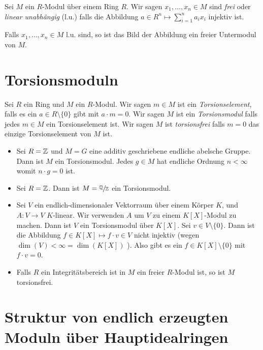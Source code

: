 \begin{definition}
	Sei $M$ ein $ R$-Modul über einem Ring $R$. Wir sagen $x_1,\ldots,x_{n} \in M$ sind \emph{frei} oder \emph{linear unabhängig} (l.u.) falls die Abbildung
	$a \in R^{n} \mapsto \sum_{i = 1}^{n} a_{i} x_{i}$ injektiv ist.

	Falls $x_1,\ldots,x_{n} \in M$ l.u. sind, so ist das Bild der Abbildung ein freier Untermodul von $M$.
\end{definition}

\section{Torsionsmoduln}
\begin{definition}
	Sei $R$ ein Ring und $M$ ein $R$-Modul. Wir sagen $m \in M$ ist ein \emph{Torsionselement}, falls es ein $a \in R \setminus \{0\} $ gibt
	mit $a \cdot m = 0$. Wir sagen $M$ ist ein \emph{Torsionsmodul} falls jedes $m \in M$ ein Torsionselement ist.
	Wir sagen $M$ ist \emph{torsionsfrei} falls $m = 0$ das einzige Torsionselement von $M$ ist.
\end{definition}

\begin{eg}
	\begin{itemize}
		\item Sei $R = \mathbb{Z}$ und $M = G$ eine additiv geschriebene endliche abelsche Gruppe. Dann ist $M$ ein Torsionsmodul.
			Jedes $g \in M$ hat endliche Ordnung $n < \infty$ womit $n \cdot g = 0$ ist.
		\item Sei $R = \mathbb{Z}$. Dann ist $M = \sfrac{\mathbb{Q}}{\mathbb{Z}}$ ein Torsionsmodul.
		\item Sei $V$ ein endlich-dimensionaler Vektorraum über einem Körper $K$, und $A : V \to V$ $K$-linear.
			Wir verwenden $A$ um $V$ zu einem $K[X]$-Modul zu machen. Dann ist $V$ ein Torsionsmodul über $K[X]$.
			Sei $v \in V \setminus \{0\} $. Dann ist die Abbildung $f \in K[X] \mapsto f \cdot v \in V$
			nicht injektiv (wegen $\dim(V) < \infty = \dim(K[X])$ ).
			Also gibt es ein $f \in K[X] \setminus \{0\} $ mit $f \cdot v = 0$.
		\item Falls $R$ ein Integritätsbereich ist in $M$ ein freier $R$-Modul ist, so ist $M$ torsionsfrei.
	\end{itemize}
\end{eg}

\section{Struktur von endlich erzeugten Moduln über Hauptidealringen}

